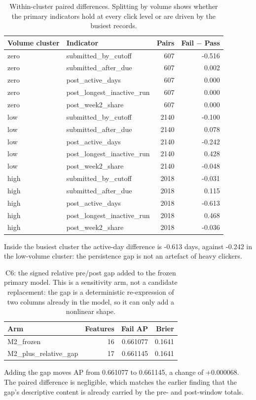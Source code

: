 \documentclass[11pt]{article}
\begin{document}
\begin{table}[t]
\centering
\scriptsize
\begin{tabular}{llrr}
\toprule
Volume cluster & Indicator & Pairs & Fail $-$ Pass \\
\midrule
zero & submitted\_by\_cutoff & 607 & -0.516 \\
zero & submitted\_after\_due & 607 & 0.002 \\
zero & post\_active\_days & 607 & 0.000 \\
zero & post\_longest\_inactive\_run & 607 & 0.000 \\
zero & post\_week2\_share & 607 & 0.000 \\
low & submitted\_by\_cutoff & 2140 & -0.100 \\
low & submitted\_after\_due & 2140 & 0.078 \\
low & post\_active\_days & 2140 & -0.242 \\
low & post\_longest\_inactive\_run & 2140 & 0.428 \\
low & post\_week2\_share & 2140 & -0.048 \\
high & submitted\_by\_cutoff & 2018 & -0.031 \\
high & submitted\_after\_due & 2018 & 0.115 \\
high & post\_active\_days & 2018 & -0.613 \\
high & post\_longest\_inactive\_run & 2018 & 0.468 \\
high & post\_week2\_share & 2018 & -0.036 \\
\bottomrule
\end{tabular}
\caption{Within-cluster paired differences. Splitting by volume shows whether the primary indicators hold at every click level or are driven by the busiest records.}
\label{tab:c5eff}
\end{table}
Inside the busiest cluster the active-day difference is -0.613 days, against -0.242 in the low-volume cluster: the persistence gap is not an artefact of heavy clickers.
\begin{table}[t]
\centering
\footnotesize
\begin{tabular}{lrrr}
\toprule
Arm & Features & Fail AP & Brier \\
\midrule
M2\_frozen & 16 & 0.661077 & 0.1641 \\
M2\_plus\_relative\_gap & 17 & 0.661145 & 0.1641 \\
\bottomrule
\end{tabular}
\caption{C6: the signed relative pre/post gap added to the frozen primary model. This is a sensitivity arm, not a candidate replacement: the gap is a deterministic re-expression of two columns already in the model, so it can only add a nonlinear shape.}
\label{tab:c6}
\end{table}
Adding the gap moves AP from 0.661077 to 0.661145, a change of +0.000068. The paired difference is negligible, which matches the earlier finding that the gap's descriptive content is already carried by the pre- and post-window totals.
\clearpage
\end{document}
